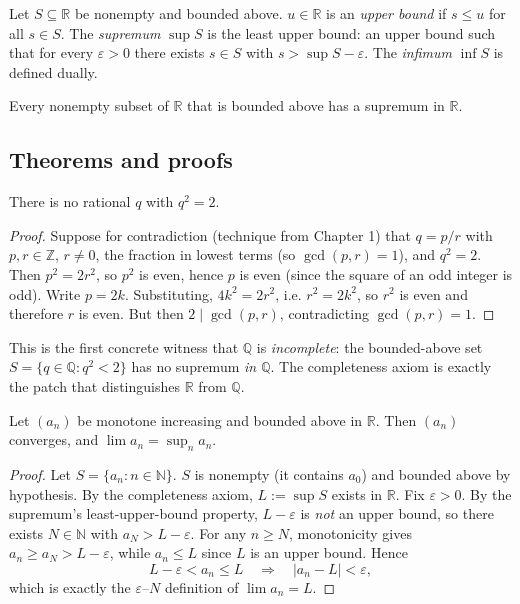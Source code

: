 \begin{definition}
Let $S \subseteq \mathbb{R}$ be nonempty and bounded above. $u \in \mathbb{R}$ is an \emph{upper bound} if $s \leq u$ for all $s \in S$. The \emph{supremum} $\sup S$ is the least upper bound: an upper bound such that for every $\varepsilon > 0$ there exists $s \in S$ with $s > \sup S - \varepsilon$. The \emph{infimum} $\inf S$ is defined dually.
\end{definition}

\begin{definition}
Every nonempty subset of $\mathbb{R}$ that is bounded above has a supremum in $\mathbb{R}$.
\end{definition}

\subsection*{Theorems and proofs}

\begin{theorem}
There is no rational $q$ with $q^2 = 2$.
\end{theorem}

\begin{proof}
Suppose for contradiction (technique from Chapter 1) that $q = p/r$ with $p, r \in \mathbb{Z}$, $r \neq 0$, the fraction in lowest terms (so $\gcd(p, r) = 1$), and $q^2 = 2$. Then $p^2 = 2 r^2$, so $p^2$ is even, hence $p$ is even (since the square of an odd integer is odd). Write $p = 2k$. Substituting, $4 k^2 = 2 r^2$, i.e. $r^2 = 2 k^2$, so $r^2$ is even and therefore $r$ is even. But then $2 \mid \gcd(p, r)$, contradicting $\gcd(p, r) = 1$.
\end{proof}

\begin{remark}
This is the first concrete witness that $\mathbb{Q}$ is \emph{incomplete}: the bounded-above set $S = \{q \in \mathbb{Q} : q^2 < 2\}$ has no supremum \emph{in $\mathbb{Q}$}. The completeness axiom is exactly the patch that distinguishes $\mathbb{R}$ from $\mathbb{Q}$.
\end{remark}

\begin{theorem}
Let $(a_n)$ be monotone increasing and bounded above in $\mathbb{R}$. Then $(a_n)$ converges, and $\lim a_n = \sup_n a_n$.
\end{theorem}

\begin{proof}
Let $S = \{a_n : n \in \mathbb{N}\}$. $S$ is nonempty (it contains $a_0$) and bounded above by hypothesis. By the completeness axiom, $L := \sup S$ exists in $\mathbb{R}$. Fix $\varepsilon > 0$. By the supremum's least-upper-bound property, $L - \varepsilon$ is \emph{not} an upper bound, so there exists $N \in \mathbb{N}$ with $a_N > L - \varepsilon$. For any $n \geq N$, monotonicity gives $a_n \geq a_N > L - \varepsilon$, while $a_n \leq L$ since $L$ is an upper bound. Hence
\[
L - \varepsilon < a_n \leq L \quad \Longrightarrow \quad |a_n - L| < \varepsilon,
\]
which is exactly the $\varepsilon$--$N$ definition of $\lim a_n = L$.
\end{proof}


